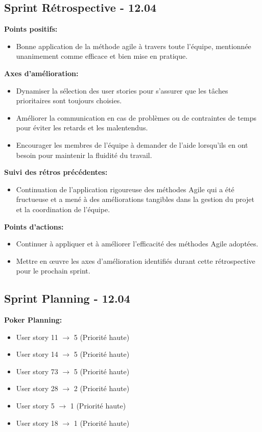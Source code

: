 \documentclass[11pt]{article}
\begin{document}
\subsection*{{\color{navy}Sprint Rétrospective - 12.04}}

\textbf{Points positifs:}
\begin{itemize}
  \item Bonne application de la méthode agile à travers toute l'équipe, mentionnée unanimement comme efficace et bien mise en pratique.
\end{itemize}

\textbf{Axes d'amélioration:}
\begin{itemize}
  \item Dynamiser la sélection des user stories pour s'assurer que les tâches prioritaires sont toujours choisies.
  \item Améliorer la communication en cas de problèmes ou de contraintes de temps pour éviter les retards et les malentendus.
  \item Encourager les membres de l'équipe à demander de l'aide lorsqu'ils en ont besoin pour maintenir la fluidité du travail.
  
\end{itemize}

\textbf{Suivi des rétros précédentes:}
\begin{itemize}
  \item Continuation de l'application rigoureuse des méthodes Agile qui a été fructueuse et a mené à des améliorations tangibles dans la gestion du projet et la coordination de l'équipe.
\end{itemize}

\textbf{Points d'actions:}
\begin{itemize}
  \item Continuer à appliquer et à améliorer l'efficacité des méthodes Agile adoptées.
  \item Mettre en œuvre les axes d'amélioration identifiés durant cette rétrospective pour le prochain sprint.

\end{itemize}



\subsection*{{\color{navy}Sprint Planning - 12.04}}

\textbf{Poker Planning:}
\begin{itemize}
    \item User story 11 $\rightarrow$ 5 (Priorité haute)
    \item User story 14 $\rightarrow$ 5 (Priorité haute)
    \item User story 73 $\rightarrow$ 5 (Priorité haute)
    \item User story 28 $\rightarrow$ 2 (Priorité haute)
    \item User story 5 $\rightarrow$ 1 (Priorité haute)
    \item User story 18 $\rightarrow$ 1 (Priorité haute)
\end{itemize}
\end{document}
